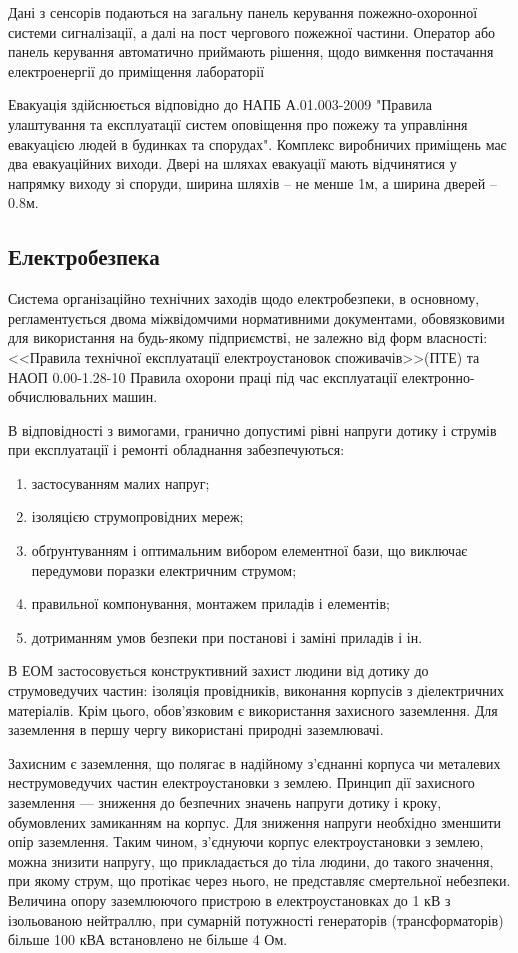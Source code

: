 Дані з сенсорів подаються на загальну панель керування пожежно-охоронної системи сигналізації, а далі на пост чергового пожежної частини. Оператор або панель керування автоматично приймають рішення, щодо вимкення постачання електроенергії
до приміщення лабораторії

Евакуація здійснюється відповідно до НАПБ А.01.003-2009 "Правила улаштування та експлуатації систем оповіщення про пожежу та управління евакуацією людей в будинках та спорудах". Комплекс виробничих приміщень має два евакуаційних виходи. Двері на шляхах евакуації мають відчинятися у напрямку виходу зі споруди, ширина шляхів -- не менше 1м, а ширина дверей -- 0.8м.

\subsection{Електробезпека}

Система організаційно технічних заходів щодо електробезпеки, в основному, регламентується двома міжвідомчими нормативними документами, обовязковими для використання на будь-якому підприємстві, не залежно від форм власності: <<Правила технічної експлуатації електроустановок споживачів>>(ПТЕ) та НАОП 0.00-1.28-10 Правила охорони праці під час експлуатації електронно-обчислювальних машин.

В відповідності з вимогами, гранично допустимі рівні напруги дотику і струмів при експлуатації і ремонті обладнання забезпечуються:
\begin{enumerate}
 \item застосуванням малих напруг; 
 \item ізоляцією струмопровідних мереж; 
 \item обґрунтуванням і оптимальним вибором елементної бази, що виключає передумови поразки електричним струмом; 
 \item правильної компонування, монтажем приладів і елементів; 
 \item дотриманням умов безпеки при постанові і заміні приладів і ін.
\end{enumerate}

В ЕОМ застосовується конструктивний захист людини від дотику до струмоведучих частин: 
ізоляція провідників, виконання корпусів з діелектричних матеріалів. Крім цього, 
обов'язковим є використання захисного заземлення. Для заземлення в першу чергу використані природні заземлювачі.

Захисним є заземлення, що полягає в надійному з'єднанні  корпуса чи  металевих неструмоведучих 
частин електроустановки з землею. Принцип дії захисного заземлення --- зниження до безпечних значень 
напруги дотику і кроку, обумовлених замиканням на корпус. Для зниження напруги необхідно зменшити 
опір заземлення. Таким чином, з'єднуючи корпус електроустановки з землею, можна знизити напругу, 
що прикладається до тіла людини, до такого значення, при якому струм, що протікає через нього, не 
представляє  смертельної небезпеки. Величина опору заземлюючого пристрою  в електроустановках до
1 кВ з ізольованою нейтраллю, при сумарній потужності генераторів (трансформаторів) більше 100 кВА
встановлено не більше 4 Ом.


